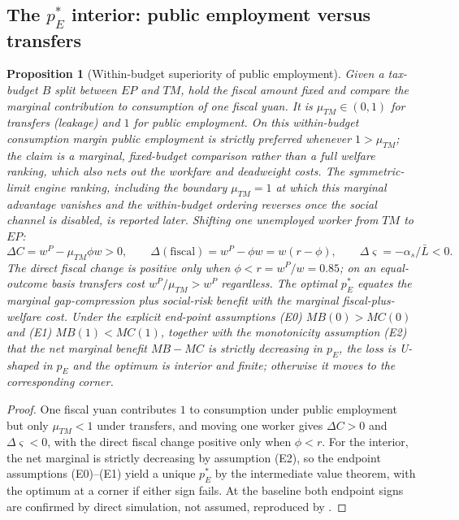 \documentclass[review,12pt]{elsarticle}
\theoremstyle{plain}
\newtheorem{proposition}[theorem]{Proposition}
\theoremstyle{definition}
\theoremstyle{remark}
\newcommand{\barL}{\bar{L}}
\begin{document}
\subsection{The $p_E^*$ interior: public employment versus transfers}
\begin{proposition}[Within-budget superiority of public employment]
\label{prop4}
Given a tax-budget $B$ split between $EP$ and $TM$, hold the fiscal amount fixed and compare the marginal contribution to consumption of one fiscal yuan. It is $\mu_{TM}\in(0,1)$ for transfers (leakage) and $1$ for public employment. On this within-budget consumption margin public employment is strictly preferred whenever $1>\mu_{TM}$; the claim is a marginal, fixed-budget comparison rather than a full welfare ranking, which also nets out the workfare and deadweight costs. The symmetric-limit engine ranking, including the boundary $\mu_{TM}=1$ at which this marginal advantage vanishes and the within-budget ordering reverses once the social channel is disabled, is reported later. Shifting one unemployed worker from $TM$ to $EP$:
\[
\Delta C=w^P-\mu_{TM}\phi w>0,\qquad
\Delta(\text{fiscal})=w^P-\phi w=w(r-\phi),\qquad
\Delta\varsigma=-\alpha_s/\barL<0.
\]
The direct fiscal change is positive only when $\phi<r=w^P/w=0.85$; on an equal-outcome basis transfers cost $w^P/\mu_{TM}>w^P$ regardless. The optimal $p_E^*$ equates the marginal gap-compression plus social-risk benefit with the marginal fiscal-plus-welfare cost. Under the explicit end-point assumptions (E0) $MB(0)>MC(0)$ and (E1) $MB(1)<MC(1)$, together with the monotonicity assumption (E2) that the net marginal benefit $MB-MC$ is strictly decreasing in $p_E$, the loss is U-shaped in $p_E$ and the optimum is interior and finite; otherwise it moves to the corresponding corner.
\end{proposition}
\begin{proof}
One fiscal yuan contributes $1$ to consumption under public employment but only $\mu_{TM}<1$ under transfers, and moving one worker gives $\Delta C>0$ and $\Delta\varsigma<0$, with the direct fiscal change positive only when $\phi<r$. For the interior, the net marginal is strictly decreasing by assumption (E2), so the endpoint assumptions (E0)--(E1) yield a unique $p_E^*$ by the intermediate value theorem, with the optimum at a corner if either sign fails. At the baseline both endpoint signs are confirmed by direct simulation, not assumed, reproduced by .
\end{proof}
\end{document}

